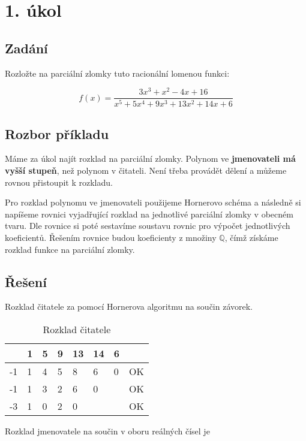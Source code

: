 \section{1. úkol}

\subsection{Zadání}
Rozložte na parciální zlomky tuto racionální lomenou funkci:

\begin{displaymath}
f(x)=\frac{3x^3+x^2-4x+16}{x^5+5x^4+9x^3+13x^2+14x+6}
\end{displaymath}

\subsection{Rozbor příkladu}
Máme za úkol najít rozklad na parciální zlomky. Polynom ve \textbf{jmenovateli má vyšší stupeň}, než polynom v čitateli. Není třeba provádět dělení a můžeme rovnou přistoupit k rozkladu.

Pro rozklad polynomu ve jmenovateli použijeme Hornerovo schéma a následně si napíšeme rovnici vyjadřující rozklad na jednotlivé parciální zlomky v obecném tvaru. Dle rovnice si poté sestavíme soustavu rovnic pro výpočet jednotlivých koeficientů. Řešením rovnice budou koeficienty z množiny $\mathbb{Q}$, čímž získáme rozklad funkce na parciální zlomky.

\subsection{Řešení}

Rozklad čitatele za pomocí Hornerova algoritmu na součin závorek.

\begin{table}[htb]
\centering
\begin{tabular}{l||l|l|l|l|l|l|l}
	 & 1 & 5 & 9 & 13 & 14 & 6 &    \\ \hline\hline
  -1 & 1 & 4 & 5 & 8  & 6  & 0 & OK \\ \hline
  -1 & 1 & 3 & 2 & 6  & 0  &   & OK \\ \hline
  -3 & 1 & 0 & 2 & 0  &    &   & OK \\
\end{tabular}
\caption{Rozklad čitatele}
\end{table}

Rozklad jmenovatele na součin v oboru reálných čísel je

